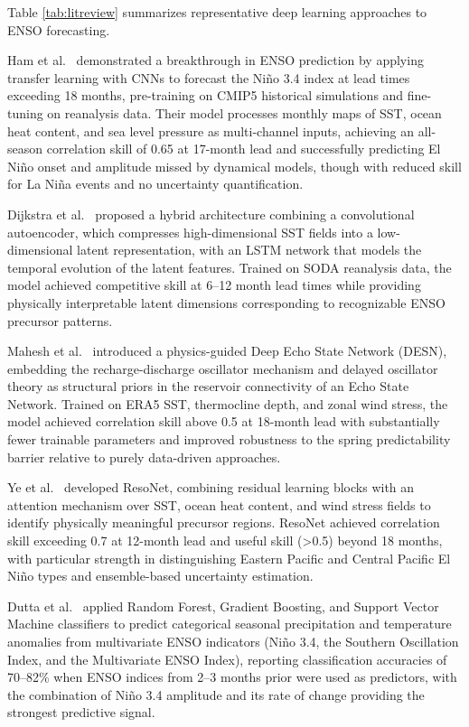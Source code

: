 \documentclass[conference]{IEEEtran}
\begin{document}
Table \ref{tab:litreview} summarizes representative deep learning approaches to ENSO forecasting.

Ham et al.\ \cite{ham2019} demonstrated a breakthrough in ENSO prediction by applying transfer learning with CNNs to forecast the Ni\~no 3.4 index at lead times exceeding 18 months, pre-training on CMIP5 historical simulations and fine-tuning on reanalysis data. Their model processes monthly maps of SST, ocean heat content, and sea level pressure as multi-channel inputs, achieving an all-season correlation skill of 0.65 at 17-month lead and successfully predicting El Ni\~no onset and amplitude missed by dynamical models, though with reduced skill for La Ni\~na events and no uncertainty quantification.

Dijkstra et al.\ \cite{dijkstra2019} proposed a hybrid architecture combining a convolutional autoencoder, which compresses high-dimensional SST fields into a low-dimensional latent representation, with an LSTM network that models the temporal evolution of the latent features. Trained on SODA reanalysis data, the model achieved competitive skill at 6--12 month lead times while providing physically interpretable latent dimensions corresponding to recognizable ENSO precursor patterns.

Mahesh et al.\ \cite{mahesh2024} introduced a physics-guided Deep Echo State Network (DESN), embedding the recharge-discharge oscillator mechanism and delayed oscillator theory as structural priors in the reservoir connectivity of an Echo State Network. Trained on ERA5 SST, thermocline depth, and zonal wind stress, the model achieved correlation skill above 0.5 at 18-month lead with substantially fewer trainable parameters and improved robustness to the spring predictability barrier relative to purely data-driven approaches.

Ye et al.\ \cite{ye2024} developed ResoNet, combining residual learning blocks with an attention mechanism over SST, ocean heat content, and wind stress fields to identify physically meaningful precursor regions. ResoNet achieved correlation skill exceeding 0.7 at 12-month lead and useful skill (\textgreater 0.5) beyond 18 months, with particular strength in distinguishing Eastern Pacific and Central Pacific El Ni\~no types and ensemble-based uncertainty estimation.

Dutta et al.\ \cite{dutta2024} applied Random Forest, Gradient Boosting, and Support Vector Machine classifiers to predict categorical seasonal precipitation and temperature anomalies from multivariate ENSO indicators (Ni\~no 3.4, the Southern Oscillation Index, and the Multivariate ENSO Index), reporting classification accuracies of 70--82\% when ENSO indices from 2--3 months prior were used as predictors, with the combination of Ni\~no 3.4 amplitude and its rate of change providing the strongest predictive signal.
\end{document}
